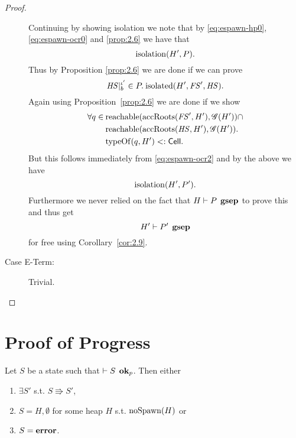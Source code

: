 \begin{proof}
\begin{description}
      Continuing by showing isolation we note that by \eqref{eq:espawn-hp0},
      \eqref{eq:espawn-ocr0} and \ref{prop:2.6} we have that
      \begin{equation}
        \mbox{$\mathrm{isolation}$}(H', P).
      \end{equation}
      Thus by Proposition \ref{prop:2.6} we are done if we can prove 
      \begin{equation}
        \mathit{HS}|_b^{\iota'} \in P. \: \mbox{$\mathrm{isolated}$}(H', \mathit{FS}', \mathit{HS}).
      \end{equation}
      Again using Proposition~\ref{prop:2.6} we are done if we show
      \begin{equation}
        \begin{aligned}
          \forall q \in \: &\mbox{$\mathrm{reachable}$}(\mbox{$\mathrm{accRoots}$}(\mathit{FS}', H'), \mathscr{G}(H')) \cap \\
            &\mbox{$\mathrm{reachable}$}(\mbox{$\mathrm{accRoots}$}(\mathit{HS}, H'), \mathscr{G}(H')) . \\
            &\mbox{$\mathrm{typeOf}$}(q, H') <: \mbox{$\mathsf{Cell}$}.
        \end{aligned}
      \end{equation}
      But this follows immediately from \eqref{eq:espawn-ocr2} and 
      by the above we have
      \begin{equation}
        \mbox{$\mathrm{isolation}$}(H', P').
      \end{equation} 
      Furthermore we never relied on the fact that $H \vdash P \:\: \mbox{\bf gsep}$ to
      prove this and thus get
      \begin{equation}
        H' \vdash P' \:\: \mbox{\bf gsep} 
      \end{equation}
      for free using Corollary~\ref{cor:2.9}.

    \item[Case {\sc E-Term}:] Trivial.
  \end{description}
\end{proof}


\section{Proof of Progress}
\label{sec:proof_of_progress}

\begin{theorem*}[Progress]
  Let $S$ be a state such that $\vdash S \:\: \mbox{{\bf ok}$_p$}$. Then either 
  \begin{enumerate}
    \item $\exists S'$ s.t. $S \Rrightarrow S'$, 
    \item $S = H, \emptyset$ for some heap $H$ s.t. $\mbox{$\mathrm{noSpawn}$}{(H)}$ or
    \item $S = \mbox{{\bf error}}$.
  \end{enumerate}
\end{theorem*}


